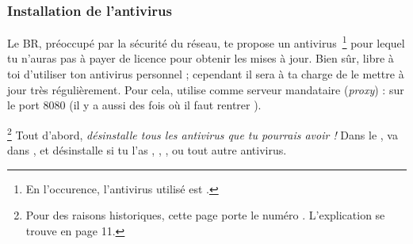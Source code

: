 



\subsubsection{Installation de l'antivirus}
\label{antivirus} Le BR, préoccupé par la sécurité du réseau, te propose un antivirus~\footnote{En
l'occurence, l'antivirus utilisé est .} pour lequel tu n'auras pas à
payer de licence pour obtenir les mises à jour. Bien s\^{u}r, libre à toi d'utiliser ton antivirus
personnel ; cependant il sera à ta charge de le mettre à jour très régulièrement. Pour cela,
utilise comme serveur mandataire (\emph{proxy}) :  sur le port 8080 (il y a aussi des fois o\`u il 
faut rentrer ).

\footnote{Pour des raisons historiques, cette page porte le numéro \thecptr. L'explication se trouve en page 11.} Tout d'abord, \emph{désinstalle tous les antivirus que tu pourrais
avoir !} Dans le , va dans ,  et
désinstalle si tu l'as , , , ou tout autre antivirus.

